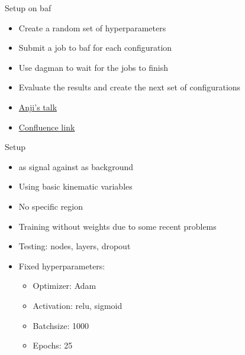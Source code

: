 \begin{frame}{Setup on baf}
    \begin{itemize}
        \item Create a random set of hyperparameters
        \vspace{0.2cm}
        \item Submit a job to baf for each configuration
        \vspace{0.2cm}
        \item Use dagman to wait for the jobs to finish
        \vspace{0.2cm}
        \item Evaluate the results and create the next set of configurations
        \vspace{0.2cm}
        \item \href{https://indico.desy.de/indico/event/23852/session/3/contribution/5/material/slides/0.pdf}{Anji's talk}
        \item \href{https://confluence.team.uni-bonn.de/display/PHYIT/Job+restarting+with+Dagman}{Confluence link}
    \end{itemize}
    
\end{frame}

\begin{frame}{Setup}
    \begin{itemize}
        \item \tZq as signal against \ttbar as background
        \item Using basic kinematic variables
        \item No specific region
        \item Training without weights due to some recent problems
        \item Testing: nodes, layers, dropout
        \item Fixed hyperparameters:
            \begin{itemize}
                \item Optimizer: Adam
                \item Activation: relu, sigmoid
                \item Batchsize: 1000
                \item Epochs: 25
            \end{itemize}
    \end{itemize}
\end{frame}

